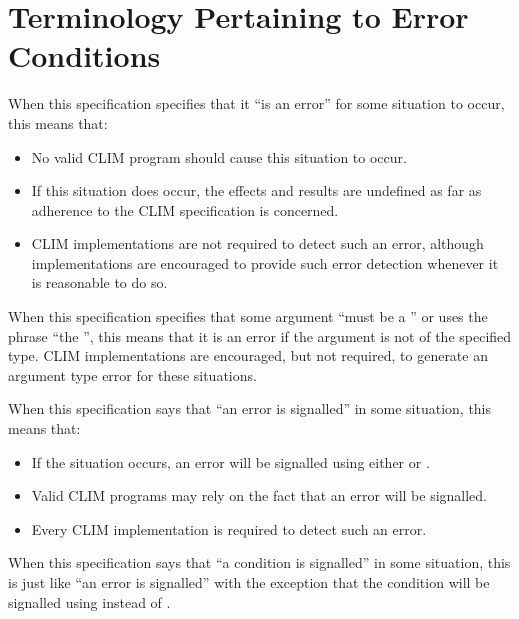 \section {Terminology Pertaining to Error Conditions}

When this specification specifies that it ``is an error'' for some situation to
occur, this means that:

\begin{itemize}
\item No valid CLIM program should cause this situation to occur.

\item If this situation does occur, the effects and results are undefined as
far as adherence to the CLIM specification is concerned.

\item CLIM implementations are not required to detect such an error, although
implementations are encouraged to provide such error detection whenever it is
reasonable to do so.
\end{itemize}

When this specification specifies that some argument ``must be a ''
or uses the phrase ``the  '', this means that it is an
error if the argument is not of the specified type.  CLIM implementations are
encouraged, but not required, to generate an argument type error for these
situations.

When this specification says that ``an error is signalled'' in some situation,
this means that:

\begin{itemize}
\item If the situation occurs, an error will be signalled using either
 or .

\item Valid CLIM programs may rely on the fact that an error will be signalled.

\item Every CLIM implementation is required to detect such an error.
\end{itemize}

When this specification says that ``a condition is signalled'' in some
situation, this is just like ``an error is signalled'' with the exception that
the condition will be signalled using  instead of .
